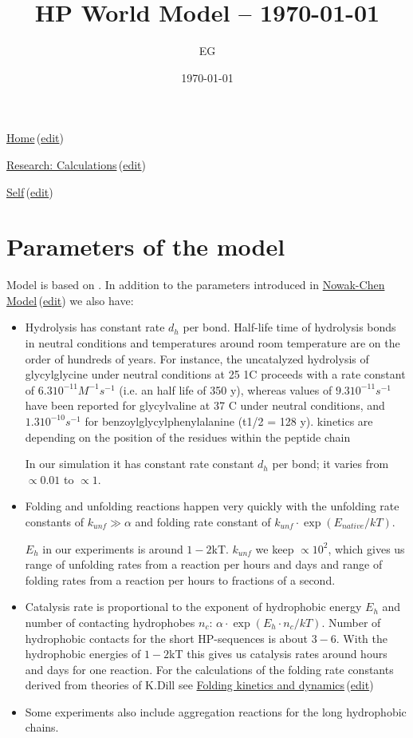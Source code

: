 \documentclass[12pt]{paper}
\title{HP World Model -- \today}
\author{EG}
\date{\today}
\newcommand{\ga}{\alpha}
\newcommand{\red}[1]{\textcolor{red}{#1}}
\newcommand{\wikilink}[2] { \href{#1.pdf}{#2}\,(\href{#1.tex}{edit})}
\begin{document}
 \maketitle
\wikilink{home}{Home}

\wikilink{research\_calculations}{Research: Calculations}

\wikilink{hp-world-model}{Self}

\tableofcontents
\section{Parameters of the model}
Model is based on \cite{nowak2008prevolutionary,Ohtsuki2009,Chen2012}.
In addition to the parameters introduced in \wikilink{nowak-chen}{Nowak-Chen Model} we also have:
\begin{itemize}
\item Hydrolysis has constant rate $d_h$ per bond. Half-life time of hydrolysis bonds in neutral 
conditions and temperatures around room temperature are on the order of hundreds of 
years.
\subitem \textbullet For instance, the
uncatalyzed hydrolysis of glycylglycine under neutral conditions
at 25 1C proceeds with a rate constant of $6.3  10^{-11} M^{-1} s^{-1}$
(i.e. an half life of 350 y), whereas values of $9.3 10^{-11} s^{-1}$
have been reported for glycylvaline at 37 C under neutral
conditions\cite{Smith1998}, and $1.3  10^{-10} s^{-1} $ for benzoylglycylphenylalanine
(t1/2 = 128 y)\cite{Bryant1996}.
\subitem \textbullet kinetics are depending on the position of the residues within the peptide 
chain \cite{Danger2012}

 In our simulation it has constant rate constant $d_h$ per bond; it varies from 
$\propto 0.01$ to $\propto 1$. 


\item Folding and unfolding reactions happen very quickly with the unfolding rate constants of 
$k_{unf}\gg\ga$ and folding rate constant of $k_{unf}\cdot\exp(E_{native}/kT)$.

$E_h$ in our experiments is around $1-2$kT\red{\cite{}}. $k_{unf}$ we keep $\propto 10^2$, which 
gives us range of unfolding rates from a reaction per hours and days and range of folding rates 
from a reaction per hours to fractions of a second.

\item Catalysis rate is proportional to the exponent of hydrophobic energy $E_h$ and number of 
contacting hydrophobes $n_c$: $\ga\cdot\exp(E_{h}\cdot n_{c}/kT)$. Number of hydrophobic contacts 
for the short HP-sequences is about $3-6$. With the hydrophobic energies of $1-2$kT this gives us 
catalysis rates around hours and days for one reaction.
For the calculations of the folding rate constants derived from theories of K.Dill see 
\wikilink{folding\_kinetics\_and\_dynamics}{Folding kinetics and dynamics}

\item Some experiments also include aggregation reactions for the long hydrophobic chains.
\end{itemize}
\end{document}
